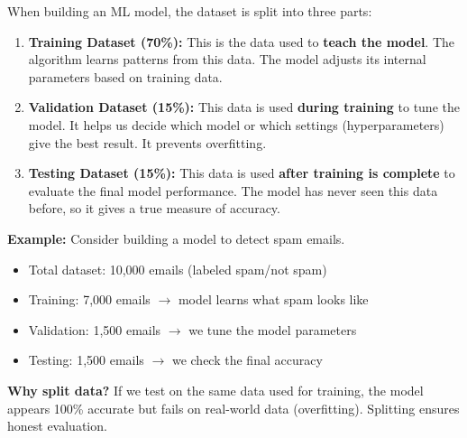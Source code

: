 \documentclass[12pt,a4paper]{article}
\newcommand{\term}[1]{\textbf{\color{headingcolor}#1}}
\begin{document}
\begin{answerenv}

When building an ML model, the dataset is split into three parts:

\begin{center}
\end{center}

\begin{enumerate}[leftmargin=1.8em, itemsep=5pt]
  \item \term{Training Dataset (70\%):} This is the data used to \textbf{teach the model}. The algorithm learns patterns from this data. The model adjusts its internal parameters based on training data.

  \item \term{Validation Dataset (15\%):} This data is used \textbf{during training} to tune the model. It helps us decide which model or which settings (hyperparameters) give the best result. It prevents overfitting.

  \item \term{Testing Dataset (15\%):} This data is used \textbf{after training is complete} to evaluate the final model performance. The model has never seen this data before, so it gives a true measure of accuracy.
\end{enumerate}

\vspace{6pt}
\textbf{\color{headingcolor}Example:} Consider building a model to detect spam emails.
\begin{itemize}[leftmargin=1.5em, itemsep=2pt]
  \item Total dataset: 10,000 emails (labeled spam/not spam)
  \item Training: 7,000 emails $\to$ model learns what spam looks like
  \item Validation: 1,500 emails $\to$ we tune the model parameters
  \item Testing: 1,500 emails $\to$ we check the final accuracy
\end{itemize}

\begin{keypoint}
\textbf{Why split data?} If we test on the same data used for training, the model appears 100\% accurate but fails on real-world data (overfitting). Splitting ensures honest evaluation.
\end{keypoint}

\end{answerenv}
\end{document}
